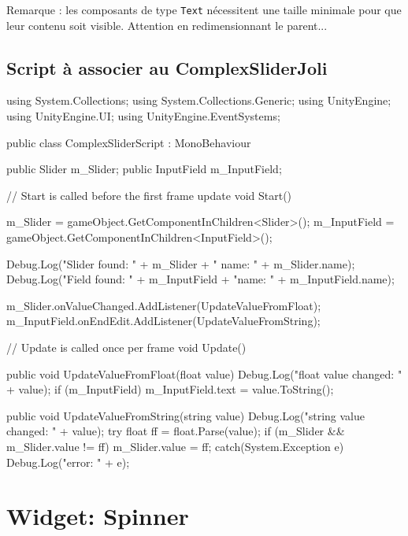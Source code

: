 \documentclass[a4paper,10pt]{article}
\newenvironment{solution}%
{\begin{tcolorbox}[breakable,colback=red!5!white,colframe=red!75!black,title=Solution]}%
{\end{tcolorbox}}
\newenvironment{boxcode}%
{\begin{tcolorbox}[breakable,colback=gray!5!white,colframe=black]}%
	{\end{tcolorbox}}
\begin{document}
\begin{solution}
Remarque : les composants de type \texttt{Text} nécessitent une taille minimale pour que leur contenu soit visible. Attention en redimensionnant le parent...

\subsection{Script à associer au ComplexSliderJoli}

\begin{boxcode}
\begin{csharpsansbord}
using System.Collections;
using System.Collections.Generic;
using UnityEngine;
using UnityEngine.UI;
using UnityEngine.EventSystems;

public class ComplexSliderScript : MonoBehaviour
{	
	public Slider m_Slider;
	public InputField m_InputField;
	
	// Start is called before the first frame update
	void Start()
	{
		m_Slider = gameObject.GetComponentInChildren<Slider>();
		m_InputField = gameObject.GetComponentInChildren<InputField>();
		
		Debug.Log("Slider found: " + m_Slider  + " name: " + m_Slider.name);
		Debug.Log("Field found: " + m_InputField + "name: " + m_InputField.name);
		
		m_Slider.onValueChanged.AddListener(UpdateValueFromFloat);
		m_InputField.onEndEdit.AddListener(UpdateValueFromString);
		
	}
	
	// Update is called once per frame
	void Update() { }
	
	public void UpdateValueFromFloat(float value)
	{
		Debug.Log("float value changed: " + value);
		if (m_InputField) { m_InputField.text = value.ToString(); }
	}
	
	public void UpdateValueFromString(string value)
	{
		Debug.Log("string value changed: " + value);
		try
		{
			float ff = float.Parse(value);
			if (m_Slider && m_Slider.value != ff) { m_Slider.value = ff; }
		}
		catch(System.Exception e) {
			Debug.Log("error: " + e);
		}
	}	
}
\end{csharpsansbord}
\end{boxcode}		
\end{solution}
\fi 



\section{Widget: Spinner}
\end{document}
